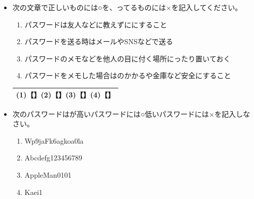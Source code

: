 \documentclass[a4paper,12pt]{jarticle}
\begin{document}
\begin{enumerate}
\begin{itemize}
                        \item
                            \theQuestion 次の文章で正しいものには○を、ってるものには×を記入してください。
                            \begin{enumerate}[label=\textbf{(\arabic*)}]
                              \item  パスワードは友人などに教えずににすること
                              \item  パスワードを送る時はメールやSNSなどで送る
                              \item  パスワードのメモなどを他人の目に付く場所にったり置いておく
                              \item パスワードをメモした場合はのかかるや金庫など安全にすること
                              \end{enumerate}
                              \begin{table}[htbp]
                                \centering
                              \begin{tabular}{|c|}
                                \hline
                                    (1)【\hspace{3pc}】(2)【\hspace{3pc}】(3)【\hspace{3pc}】(4)【\hspace{3pc}】\\
                                    \hline
                                \end{tabular}
                                \end{table}
                        \item
                            \theQuestion 次のパスワードはが高いパスワードには○低いパスワードには×を記入しなさい。
                            \begin{enumerate}[label=\textbf{(\arabic*)}]
                              \item  Wp9jaFk6agkoa0la
                              \item  Abcdefg123456789
                              \item  AppleMan0101
                              \item  Kaei1
                              \end{enumerate}
                              \begin{table}[htbp]

\end{table}
\end{itemize}
\end{enumerate}
\end{document}
